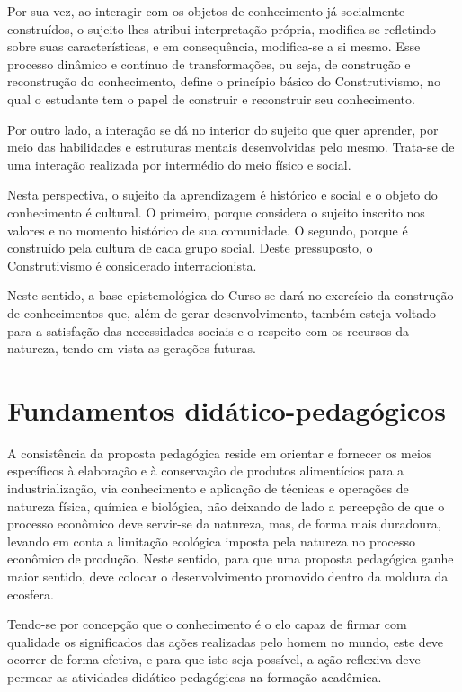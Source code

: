 \documentclass[
	12pt,				%
	openright,			%
  oneside,     %
	a4paper,			%
	english,			%
	french,				%
	spanish,			%
	brazil				%
	]{abntex2}
\begin{document}
Por sua vez, ao interagir com os objetos de conhecimento já socialmente
construídos, o sujeito lhes atribui interpretação própria, modifica-se
refletindo sobre suas características, e em consequência, modifica-se a si
mesmo. Esse processo dinâmico e contínuo de transformações, ou seja, de
construção e reconstrução do conhecimento, define o princípio básico do
Construtivismo, no qual o estudante tem o papel de construir e reconstruir seu
conhecimento.

Por outro lado, a interação se dá no interior do sujeito que quer aprender, por
meio das habilidades e estruturas mentais desenvolvidas pelo mesmo. Trata-se de
uma interação realizada por intermédio do meio físico e social.

Nesta perspectiva, o sujeito da aprendizagem é histórico e social e o objeto do
conhecimento é cultural. O primeiro, porque considera o sujeito inscrito nos
valores e no momento histórico de sua comunidade. O segundo, porque é construído
pela cultura de cada grupo social. Deste pressuposto, o Construtivismo é
considerado interracionista.

Neste sentido, a base epistemológica do Curso se dará no exercício da construção
de conhecimentos que, além de gerar desenvolvimento, também esteja voltado para
a satisfação das necessidades sociais e o respeito com os recursos da natureza,
tendo em vista as gerações futuras.

\section{Fundamentos didático-pedagógicos}

A consistência da proposta pedagógica reside em orientar e fornecer os meios
específicos à elaboração e à conservação de produtos alimentícios para a
industrialização, via conhecimento e aplicação de técnicas e operações de
natureza física, química e biológica, não deixando de lado a percepção de que o
processo econômico deve servir-se da natureza, mas, de forma mais duradoura,
levando em conta a limitação ecológica imposta pela natureza no processo
econômico de produção. Neste sentido, para que uma proposta pedagógica ganhe
maior sentido, deve colocar o desenvolvimento promovido dentro da moldura da
ecosfera.

Tendo-se por concepção que o conhecimento é o elo capaz de firmar com qualidade
os significados das ações realizadas pelo homem no mundo, este deve ocorrer de
forma efetiva, e para que isto seja possível, a ação reflexiva deve permear as
atividades didático-pedagógicas na formação acadêmica.
\end{document}
